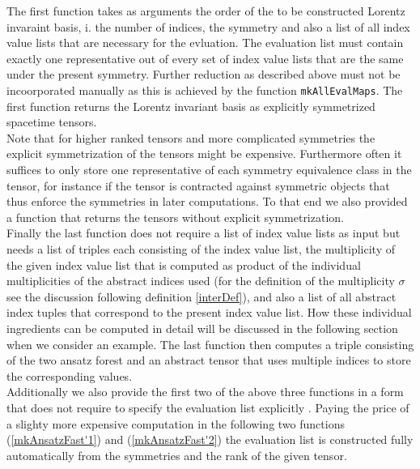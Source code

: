 \documentclass[a4paper,12pt, DIV=14, BCOR=5mm, twoside, headsepline, numbers=noenddot]{scrbook}
\begin{document}
The first function takes as arguments the order of the to be constructed Lorentz invaraint basis, i. the number of indices, the symmetry and also a list of all index value lists that are necessary for the evluation. The evaluation list must contain exactly one representative out of every set of index value lists that are the same under the present symmetry. Further reduction as described above must not be incoorporated manually as this is achieved by the function \texttt{mkAllEvalMaps}.
The first function returns the Lorentz invariant basis as explicitly symmetrized spacetime tensors.\\

Note that for higher ranked tensors and more complicated symmetries the explicit symmetrization of the tensors might be expensive. Furthermore often it suffices to only store one representative of each symmetry equivalence class in the tensor, for instance if the tensor is contracted against symmetric objects that thus enforce the symmetries in later computations. To that end we also provided a function that returns the tensors without explicit symmetrization.\\

Finally the last function does not require a list of index value lists as input but needs a list of triples each consisting of the index value list, the multiplicity of the given index value list that is computed as product of the individual multiplicities of the abstract indices used (for the definition of the multiplicity $\sigma$ see the discussion following definition \ref{interDef}), and also a list of all abstract index tuples that correspond to the present index value list. How these individual ingredients can be computed in detail will be discussed in the following section when we consider an example. The last function then computes a triple consisting of the two ansatz forest and an abstract tensor that uses multiple indices to store the corresponding values. \\

Additionally we also provide the first two of the above three functions in a form that does not require to specify the evaluation list explicitly . Paying the price of a slighty more expensive computation in the following two functions (\ref{mkAnsatzFast'1}) and (\ref{mkAnsatzFast'2}) the evaluation list is constructed fully automatically from the symmetries and the rank of the given tensor.
\end{document}
